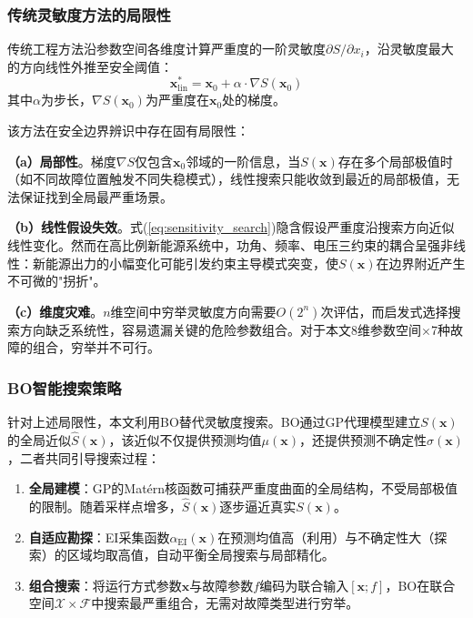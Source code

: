 \documentclass[a4paper,11pt]{ctexart}
\newcommand{\bx}{\mathbf{x}}
\begin{document}
\subsubsection{传统灵敏度方法的局限性}

传统工程方法\cite{hamilton2023shap_tsa}沿参数空间各维度计算严重度的一阶灵敏度$\partial S / \partial x_i$，沿灵敏度最大的方向线性外推至安全阈值：
\begin{equation}
    \bx_{\text{lin}}^* = \bx_0 + \alpha \cdot \nabla S(\bx_0)
    \label{eq:sensitivity_search}
\end{equation}
其中$\alpha$为步长，$\nabla S(\bx_0)$为严重度在$\bx_0$处的梯度。

该方法在安全边界辨识中存在固有局限性：

\textbf{（a）局部性}。梯度$\nabla S$仅包含$\bx_0$邻域的一阶信息，当$S(\bx)$存在多个局部极值时（如不同故障位置触发不同失稳模式），线性搜索只能收敛到最近的局部极值，无法保证找到全局最严重场景。

\textbf{（b）线性假设失效}。式(\ref{eq:sensitivity_search})隐含假设严重度沿搜索方向近似线性变化。然而在高比例新能源系统中，功角、频率、电压三约束的耦合呈强非线性：新能源出力的小幅变化可能引发约束主导模式突变，使$S(\bx)$在边界附近产生不可微的"拐折"。

\textbf{（c）维度灾难}。$n$维空间中穷举灵敏度方向需要$O(2^n)$次评估，而启发式选择搜索方向缺乏系统性，容易遗漏关键的危险参数组合。对于本文8维参数空间$\times$7种故障的组合，穷举并不可行。

\subsubsection{BO智能搜索策略}

针对上述局限性，本文利用BO替代灵敏度搜索。BO通过GP代理模型建立$S(\bx)$的全局近似$\hat{S}(\bx)$，该近似不仅提供预测均值$\mu(\bx)$，还提供预测不确定性$\sigma(\bx)$，二者共同引导搜索过程：

\begin{enumerate}
    \item \textbf{全局建模}：GP的Matérn核函数可捕获严重度曲面的全局结构，不受局部极值的限制。随着采样点增多，$\hat{S}(\bx)$逐步逼近真实$S(\bx)$。

    \item \textbf{自适应勘探}：EI采集函数$\alpha_{\text{EI}}(\bx)$在预测均值高（利用）与不确定性大（探索）的区域均取高值，自动平衡全局搜索与局部精化。

    \item \textbf{组合搜索}：将运行方式参数$\bx$与故障参数$f$编码为联合输入$[\bx; f]$，BO在联合空间$\mathcal{X} \times \mathcal{F}$中搜索最严重组合，无需对故障类型进行穷举。
\end{enumerate}
\end{document}
